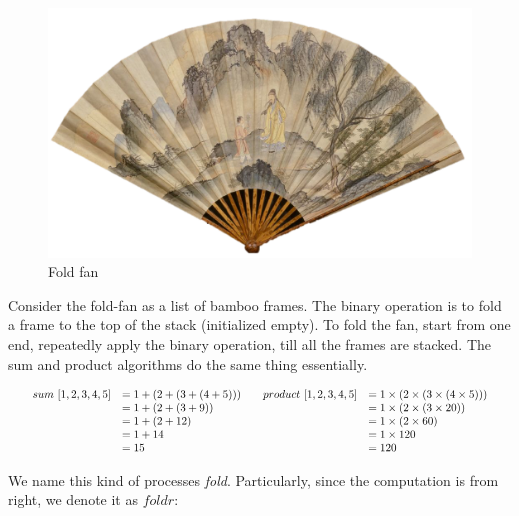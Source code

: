 \documentclass[b5paper]{article}
\begin{document}
\begin{figure}[htbp]
  \centering
  \includegraphics[scale=0.4]{img/fold-fan}
  \caption{Fold fan}
  \label{fig:fold-fan}
\end{figure}

Consider the fold-fan as a list of bamboo frames. The binary operation is to fold a frame to the top of the stack (initialized empty). To fold the fan, start from one end, repeatedly apply the binary operation, till all the frames are stacked. The sum and product algorithms do the same thing essentially.

\[
\resizebox{\linewidth}{!}{\ensuremath{
\begin{array}{cc}
  \begin{array}{rl}
  sum\ [1, 2, 3, 4, 5 ] & = 1 + (2 + (3 + (4 + 5))) \\
           & = 1 + (2 + (3 + 9)) \\
           & = 1 + (2 + 12) \\
           & = 1 + 14 \\
           & = 15
  \end{array}
&
  \begin{array}{rl}
  product\ [1, 2, 3, 4, 5 ] & = 1 \times (2 \times (3 \times (4 \times 5))) \\
           & = 1 \times (2 \times (3 \times 20)) \\
           & = 1 \times (2 \times 60) \\
           & = 1 \times 120 \\
           & = 120
  \end{array}
\end{array}
}}
\]

We name this kind of processes {\em fold}. Particularly, since the computation is from right, we denote it as $foldr$:
\end{document}

